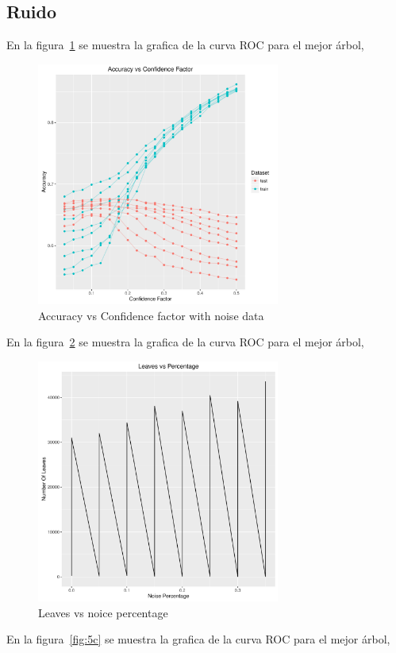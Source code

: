 \subsection{Ruido}

En la figura~\ref{fig:5a} se muestra la grafica de la curva ROC para el mejor árbol,

\begin{figure}
  \centering
  \includegraphics[width = 8cm]{5a.pdf}
  \caption{Accuracy vs Confidence factor with noise data}
  \label{fig:5a}
\end{figure}

En la figura~\ref{fig:5b} se muestra la grafica de la curva ROC para el mejor árbol,

\begin{figure}
  \centering
  \includegraphics[width = 8cm]{5b.pdf}
  \caption{Leaves vs noice percentage}
  \label{fig:5b}
\end{figure}

En la figura~\ref{fig:5c} se muestra la grafica de la curva ROC para el mejor árbol,


